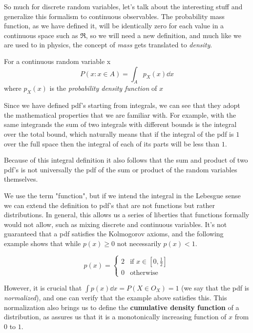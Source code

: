 So much for discrete random variables, let's talk about the interesting stuff and generalize this formalism to continuous observables. The probability mass function, as we have defined it, will be identically zero for each value in a continuous space such as $\Re$, so we will need a new definition, and much like we are used to in physics, the concept of \emph{mass} gets translated to \emph{density}.

\begin{definition}
	For a continuous random variable x
	\[
	P(x:x\in A)= \int_{A} p_X(x)\dd x
	\]
	where $p_X(x)$ is the \emph{probability density function} of $x$ 
\end{definition}

Since we have defined pdf's starting from integrals, we can see that they adopt the mathematical properties that we are familiar with. For example, with the same integrands the sum of two integrals with different bounds is the integral over the total bound, which naturally means that if the integral of the pdf is $1$ over the full space then the integral of each of its parts will be less than $1$.

Because of this integral definition it also follows that the sum and product of two pdf's is not universally the pdf of the sum or product of the random variables themselves. 

We use the term "function", but if we intend the integral in the Lebesgue sense we can extend the definition to pdf's that are not functions but rather distributions. In general, this allows us a series of liberties that functions formally would not allow, such as mixing discrete and continuous variables. It's not guaranteed that a pdf satisfies the Kolmogorov axioms, and the following example shows that while $p(x)\geq 0$ not necessarily $p(x) < 1$.

	\[
	p(x) = \begin{cases} 2 & \text{if } x \in [0,\frac{1}{2}] \\ 0 &  \text{otherwise} \end{cases}
	\]


However, it is crucial that $\int p(x)\dd x = P(X\in O_X) = 1$ (we say that the pdf is \emph{normalized}), and one can verify that the example above satisfies this. This normalization also brings us to define the \textbf{cumulative density function} of a distribution, as assures us that it is a monotonically increasing function of $x$ from $0$ to $1$.

